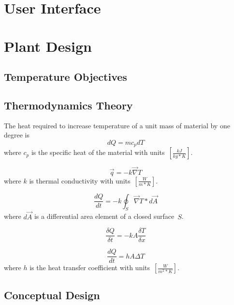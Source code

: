 \documentclass[10pt, twocolumn]{article}
\begin{document}
\tableofcontents

\section{User Interface}

\section{Plant Design}

\subsection{Temperature Objectives}

\subsection{Thermodynamics Theory}

The heat required to increase temperature of a unit mass of material by one degree is
\begin{equation}
dQ=mc_{p}dT
\label{specific-heat-eq}
\end{equation}
where \(c_{p}\) is the specific heat of the material with \mbox{units \(\left[\frac{kJ}{kg*K}\right]\)}.

\begin{equation}
\vec{q}=-k\vec{\nabla}T
\label{fouriers-law-differential-form}
\end{equation}
where \(k\) is thermal conductivity with \mbox{units \(\left[\frac{W}{m*K}\right]\)}.

\begin{equation*}
\frac{dQ}{dt}=-k\oint _{S}\vec{\nabla}T*d\vec{A}
\end{equation*}
where \(d\vec{A}\) is a differential area element of a closed \mbox{surface \(S\)}.

\begin{equation}
\frac{\delta Q}{\delta t}=-kA\frac{\delta T}{\delta x}
\label{fouriers-law-in-1D}
\end{equation}

\begin{equation}
\frac{dQ}{dt}=hA\Delta T
\label{newtons-cooling-law}
\end{equation}
where \(h\) is the heat transfer coefficient with \mbox{units \(\left[\frac{W}{m^{2}*K}\right]\)}.

\subsection{Conceptual Design}
\end{document}
